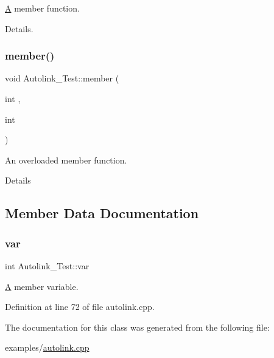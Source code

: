 \mbox{\hyperlink{class_a}{A}} member function. 

Details. \mbox{\label{class_autolink___test_acf783a43c2b4b6cc9dd2361784eca2e1}} 
\subsubsection{\texorpdfstring{member()}{member()}\hspace{0.1cm}{\footnotesize\ttfamily [2/2]}}
{\footnotesize\ttfamily void Autolink\+\_\+\+Test\+::member (\begin{DoxyParamCaption}\item[{int}]{,  }\item[{int}]{ }\end{DoxyParamCaption})}



An overloaded member function. 

Details 

\subsection{Member Data Documentation}
\mbox{\label{class_autolink___test_a8de85603114bc9b9e53bd40764e9b499}} 
\subsubsection{\texorpdfstring{var}{var}}
{\footnotesize\ttfamily int Autolink\+\_\+\+Test\+::var\hspace{0.3cm}{\ttfamily [protected]}}



\mbox{\hyperlink{class_a}{A}} member variable. 



Definition at line 72 of file autolink.\+cpp.



The documentation for this class was generated from the following file\+:\begin{DoxyCompactItemize}
\item 
examples/\mbox{\hyperlink{autolink_8cpp}{autolink.\+cpp}}\end{DoxyCompactItemize}
